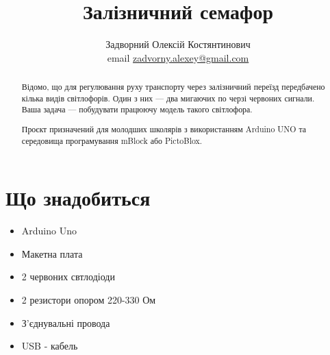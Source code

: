 \documentclass[oneside, final]{article}
\title{\bf Залізничний семафор}
\author{Задворний Олексій Костянтинович \\ 
		email \href{mailto:zadvorny.alexey@gmail.com}{zadvorny.alexey@gmail.com}
}
\begin{document}
\maketitle

\begin{abstract}
\noindent Відомо, що для регулювання руху транспорту через залізничний переїзд передбачено кілька видів світлофорів.
Один з них — два мигаючих по черзі червоних сигнали.
Ваша задача — побудувати працюючу модель такого світлофора.

\noindent Проєкт призначений для молодших школярів з використанням Arduino UNO та середовища програмування mBlock або PictoBlox.
\end{abstract}

\section{Що знадобиться}
	\begin{itemize}
		\item Arduino Uno
		\item Макетна плата
		\item 2 червоних свтлодіоди
		\item 2 резистори опором 220-330 Ом
		\item З’єднувальні провода
		\item USB - кабель
	\end{itemize}
\end{document}
